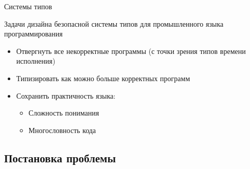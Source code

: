 \documentclass[usenames, dvipsnames]{beamer}
\begin{document}
\begin{frame}{Системы типов}
        \begin{block}{Задачи дизайна безопасной системы типов для промышленного языка программирования}
            \begin{itemize}
                \item Отвергнуть все некорректные программы (с точки зрения типов времени исполнения)
                \item Типизировать как можно больше корректных программ
                \item Сохранить практичность языка:
                \begin{itemize}
                    \item Сложность понимания
                    \item Многословность кода
                \end{itemize}
            \end{itemize}
        \end{block}
    \end{frame}


    \subsection{Постановка проблемы}
\end{document}
